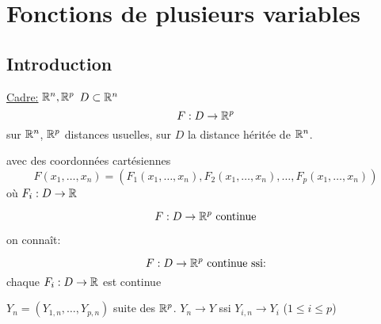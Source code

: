 
\chapter{Fonctions de plusieurs variables}
\section{Introduction}
\underline{Cadre:} $\mathbb{R}^n, \mathbb{R}^p$ $D \subset \mathbb{R}^n$
\[
F:D \to \mathbb{R}^p
\] 
sur $\mathbb{R}^n$, $\mathbb{R}^p$ distances usuelles, sur $D$ la distance héritée de  $\mathbb{R}^n$.

avec des coordonnées cartésiennes
\[
F(x_1, \ldots, x_n) = (F_1(x_1, \ldots, x_n), F_2(x_1, \ldots, x_n), \ldots, F_p(x_1, \ldots, x_n))
\] 
où $F_i: D \to \mathbb{R}$

\[
F: D \to \mathbb{R}^p \text{ continue}
\] 

on connaît:
\begin{lemma}
   \[
   F: D \to  \mathbb{R}^p \text{ continue ssi:}
   \]  
   chaque $F_i: D \to \mathbb{R}$ est continue
\end{lemma}
\begin{preuve}
    $Y_n = (Y_{1,n}, \ldots, Y_{p, n})$  suite des $\mathbb{R}^p$. $Y_n \to Y$ ssi $Y_{i,n} \to Y_i$ ($1 \le i \le p$)
\end{preuve}

